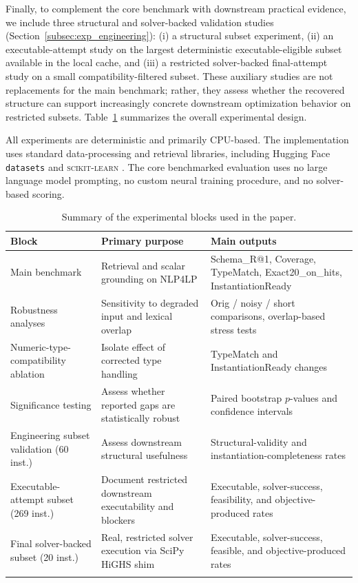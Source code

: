 \documentclass[pdflatex,sn-basic,Numbered]{sn-jnl}
\begin{document}
Finally, to complement the core benchmark with downstream practical evidence, we include three structural and solver-backed validation studies (Section~\ref{subsec:exp_engineering}): (i) a structural subset experiment, (ii) an executable-attempt study on the largest deterministic executable-eligible subset available in the local cache, and (iii) a restricted solver-backed final-attempt study on a small compatibility-filtered subset. These auxiliary studies are not replacements for the main benchmark; rather, they assess whether the recovered structure can support increasingly concrete downstream optimization behavior on restricted subsets. Table~\ref{tab:exp_blocks} summarizes the overall experimental design.

All experiments are deterministic and primarily CPU-based. The implementation uses standard data-processing and retrieval libraries, including Hugging Face \texttt{datasets} \cite{lhoest2021datasets} and \textsc{scikit-learn} \cite{pedregosa2011sklearn}. The core benchmarked evaluation uses no large language model prompting, no custom neural training procedure, and no solver-based scoring.

\begin{table}[t]
\centering
\caption{Summary of the experimental blocks used in the paper.}
\label{tab:exp_blocks}
\small
\begin{tabularx}{\linewidth}{X X X}
\toprule
Block & Primary purpose & Main outputs \\
\midrule
Main benchmark & Retrieval and scalar grounding on \textsc{NLP4LP} & Schema\_R@1, Coverage, TypeMatch, Exact20\_on\_hits, InstantiationReady \\
Robustness analyses & Sensitivity to degraded input and lexical overlap & Orig / noisy / short comparisons, overlap-based stress tests \\
Numeric-type-compatibility ablation & Isolate effect of corrected type handling & TypeMatch and InstantiationReady changes \\
Significance testing & Assess whether reported gaps are statistically robust & Paired bootstrap $p$-values and confidence intervals \\
Engineering subset validation (60 inst.) & Assess downstream structural usefulness & Structural-validity and instantiation-completeness rates \\
Executable-attempt subset (269 inst.) & Document restricted downstream executability and blockers & Executable, solver-success, feasibility, and objective-produced rates \\
Final solver-backed subset (20 inst.) & Real, restricted solver execution via SciPy HiGHS shim & Executable, solver-success, feasible, and objective-produced rates \\
\botrule
\end{tabularx}
\end{table}
\end{document}
